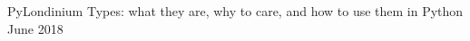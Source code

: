 \begin{cvawards}

\cvaward
  {PyLondinium}
  {Types: what they are, why to care, and how to use them in Python}
  {}
  {June 2018}

\end{cvawards}
